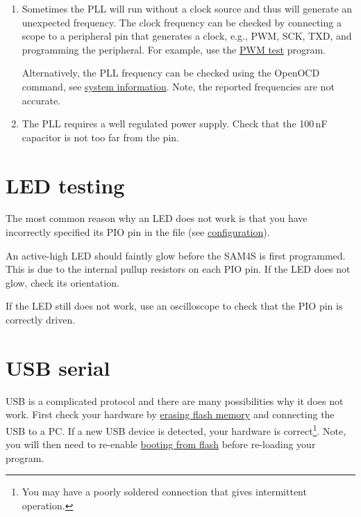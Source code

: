 \begin{enumerate}
\item Sometimes the PLL will run without a clock source and thus will
  generate an unexpected frequency.  The clock frequency can be
  checked by connecting a scope to a peripheral pin that generates a
  clock, e.g., PWM, SCK, TXD, and programming the peripheral.  For
  example, use the \hyperref[pwm-test]{PWM test} program.

  Alternatively, the PLL frequency can be checked using the OpenOCD
   command, see
  \hyperref[system-information]{system information}.  Note, the
  reported frequencies are not accurate.

\item The PLL requires a well regulated power supply.  Check that the
  100\,nF capacitor is not too far from the  pin.
\end{enumerate}


\section{LED testing}
\label{debugging-LED}

The most common reason why an LED does not work is that you have
incorrectly specified its PIO pin in the  file (see
\protect\hyperref[configuration]{configuration}).

An active-high LED should faintly glow before the SAM4S is first
programmed.  This is due to the internal pullup resistors on each PIO
pin.  If the LED does not glow, check its orientation.

If the LED still does not work, use an oscilloscope to check that the
PIO pin is correctly driven.


\section{USB serial}
\label{debugging-usb}

USB is a complicated protocol and there are many possibilities why it
does not work.  First check your hardware by
\hyperref[erasing-flash-memory]{erasing flash memory} and connecting
the USB to a PC.  If a new USB device is detected, your hardware is
correct\footnote{You may have a poorly soldered connection that gives
  intermittent operation.}.  Note, you will then need to re-enable
\hyperref[booting-from-flash-memory]{booting from flash} before
re-loading your program.

